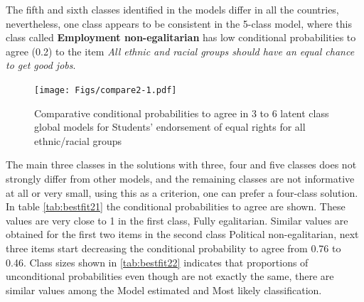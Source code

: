 \documentclass[12pt,a4paper,oneside]{reedthesis}
\begin{document}
The fifth and sixth classes identified in the models differ in all the countries, nevertheless, one class appears to be consistent in the 5-class model, where this class called \textbf{Employment non-egalitarian} has low conditional probabilities to agree (0.2) to the item \emph{All ethnic and racial groups should have an equal chance to get good jobs}.
\begin{figure}
\centering
\texttt{[image: Figs/compare2-1.pdf]}
\caption{\label{fig:compare2}Comparative conditional probabilities to agree in 3 to 6 latent class global models for Students' endorsement of equal rights for all ethnic/racial groups}
\end{figure}
The main three classes in the solutions with three, four and five classes does not strongly differ from other models, and the remaining classes are not informative at all or very small, using this as a criterion, one can prefer a four-class solution. In table \ref{tab:bestfit21} the conditional probabilities to agree are shown. These values are very close to 1 in the first class, Fully egalitarian. Similar values are obtained for the first two items in the second class Political non-egalitarian, next three items start decreasing the conditional probability to agree from 0.76 to 0.46. Class sizes shown in \ref{tab:bestfit22} indicates that proportions of unconditional probabilities even though are not exactly the same, there are similar values among the Model estimated and Most likely classification.

\newpage
\end{document}
